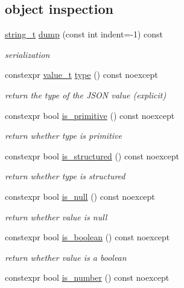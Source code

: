 \subsection*{object inspection}
\begin{DoxyCompactItemize}
\item 
\hyperlink{a00025_ab63e618bbb0371042b1bec17f5891f42}{string\+\_\+t} \hyperlink{a00025_a805e3f3a2f374da0e14942eec7400e40}{dump} (const int indent=-\/1) const 
\begin{DoxyCompactList}\small\item\em serialization \end{DoxyCompactList}\item 
constexpr \hyperlink{a00025_a231b02148577b69a154b2ce2c87a5522}{value\+\_\+t} \hyperlink{a00025_a848cbae3bd3502ffbf738320bf5eb3aa}{type} () const  noexcept
\begin{DoxyCompactList}\small\item\em return the type of the J\+S\+ON value (explicit) \end{DoxyCompactList}\item 
constexpr bool \hyperlink{a00025_a7c774ef0eceff6d06095f617e2dbd488}{is\+\_\+primitive} () const  noexcept
\begin{DoxyCompactList}\small\item\em return whether type is primitive \end{DoxyCompactList}\item 
constexpr bool \hyperlink{a00025_a558b345044c38a9f6ad522592cc700c8}{is\+\_\+structured} () const  noexcept
\begin{DoxyCompactList}\small\item\em return whether type is structured \end{DoxyCompactList}\item 
constexpr bool \hyperlink{a00025_a685d9d6a8a45bfcb8455b147257cdffb}{is\+\_\+null} () const  noexcept
\begin{DoxyCompactList}\small\item\em return whether value is null \end{DoxyCompactList}\item 
constexpr bool \hyperlink{a00025_a8f7e67d903f918cd08261219fb47a9f0}{is\+\_\+boolean} () const  noexcept
\begin{DoxyCompactList}\small\item\em return whether value is a boolean \end{DoxyCompactList}\item 
constexpr bool \hyperlink{a00025_a1407f91b4689bbc56d1a3c401a5bb649}{is\+\_\+number} () const  noexcept

\end{DoxyCompactItemize}

